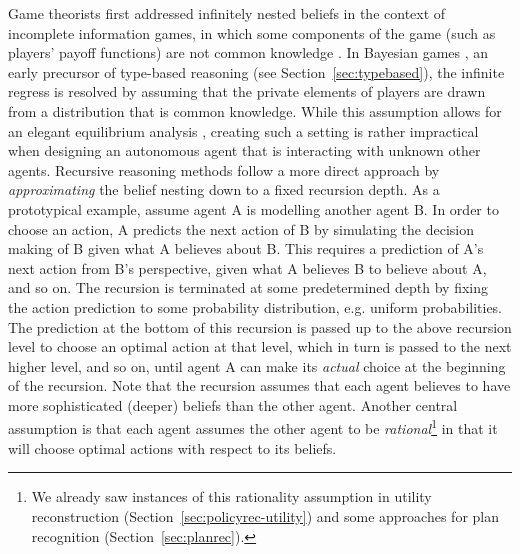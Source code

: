 \documentclass[final,1p,times,authoryear]{elsarticle}
\begin{document}
Game theorists first addressed infinitely nested beliefs in the context of incomplete information games, in which some components of the game (such as players' payoff functions) are not common knowledge \citep{h1962}. In Bayesian games \citep{h1967}, an early precursor of type-based reasoning (see Section~\ref{sec:typebased}), the infinite regress is resolved by assuming that the private elements of players are drawn from a distribution that is common knowledge. While this assumption allows for an elegant equilibrium analysis \citep{h1968b}, creating such a setting is rather impractical when designing an autonomous agent that is interacting with unknown other agents. Recursive reasoning methods follow a more direct approach by \emph{approximating} the belief nesting down to a fixed recursion depth. As a prototypical example, assume agent A is modelling another agent B. In order to choose an action, A predicts the next action of B by simulating the decision making of B given what A believes about B. This requires a prediction of A's next action from B's perspective, given what A believes B to believe about A, and so on. The recursion is terminated at some predetermined depth by fixing the action prediction to some probability distribution, e.g. uniform probabilities. The prediction at the bottom of this recursion is passed up to the above recursion level to choose an optimal action at that level, which in turn is passed to the next higher level, and so on, until agent A can make its \emph{actual} choice at the beginning of the recursion. Note that the recursion assumes that each agent believes to have more sophisticated (deeper) beliefs than the other agent. Another central assumption is that each agent assumes the other agent to be \emph{rational}\footnote{We already saw instances of this rationality assumption in utility reconstruction (Section~\ref{sec:policyrec-utility}) and some approaches for plan recognition (Section~\ref{sec:planrec}).} in that it will choose optimal actions with respect to its beliefs.
\end{document}
